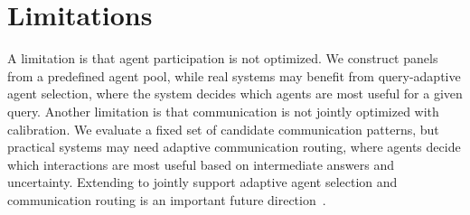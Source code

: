 \section{Limitations}
A limitation is that agent participation is not optimized. 
We construct panels from a predefined agent pool, while real systems may benefit from query-adaptive agent selection, where the system decides which agents are most useful for a given query.
Another limitation is that communication is not jointly optimized with calibration. 
We evaluate a fixed set of candidate communication patterns, but practical systems may need adaptive communication routing, where agents decide which interactions are most useful based on intermediate answers and uncertainty. 
Extending \methodname{} to jointly support adaptive agent selection and communication routing is an important future direction~\cite{li2026same,zhang2025agentrouter,shi2026ng,huang2026evolverouter}.